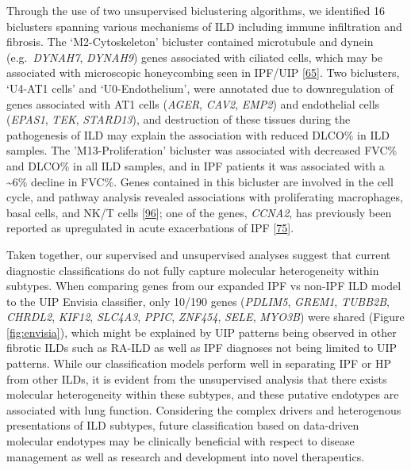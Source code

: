 \documentclass[
]{article}
\begin{document}
Through the use of two unsupervised biclustering algorithms, we identified 16 biclusters spanning various mechanisms of ILD including immune infiltration and fibrosis. The `M2-Cytoskeleton' bicluster contained microtubule and dynein (e.g.~\textit{DYNAH7}, \textit{DYNAH9}) genes associated with ciliated cells, which may be associated with microscopic honeycombing seen in IPF/UIP {[}\protect\hyperlink{ref-yang_expression_2013}{65}{]}. Two biclusters, `U4-AT1 cells' and `U0-Endothelium', were annotated due to downregulation of genes associated with AT1 cells (\textit{AGER}, \textit{CAV2}, \textit{EMP2}) and endothelial cells (\textit{EPAS1}, \textit{TEK}, \textit{STARD13}), and destruction of these tissues during the pathogenesis of ILD may explain the association with reduced DLCO\% in ILD samples. The 'M13-Proliferation' bicluster was associated with decreased FVC\% and DLCO\% in all ILD samples, and in IPF patients it was associated with a \textasciitilde6\% decline in FVC\%. Genes contained in this bicluster are involved in the cell cycle, and pathway analysis revealed associations with proliferating macrophages, basal cells, and NK/T cells {[}\protect\hyperlink{ref-travaglini_molecular_2020}{96}{]}; one of the genes, \textit{CCNA2}, has previously been reported as upregulated in acute exacerbations of IPF {[}\protect\hyperlink{ref-konishi_gene_2009}{75}{]}.

Taken together, our supervised and unsupervised analyses suggest that current diagnostic classifications do not fully capture molecular heterogeneity within subtypes. When comparing genes from our expanded IPF vs non-IPF ILD model to the UIP Envisia classifier, only 10/190 genes (\textit{PDLIM5}, \textit{GREM1}, \textit{TUBB2B}, \textit{CHRDL2}, \textit{KIF12}, \textit{SLC4A3}, \textit{PPIC}, \textit{ZNF454}, \textit{SELE}, \textit{MYO3B}) were shared (Figure \ref{fig:envisia}), which might be explained by UIP patterns being observed in other fibrotic ILDs such as RA-ILD as well as IPF diagnoses not being limited to UIP patterns. While our classification models perform well in separating IPF or HP from other ILDs, it is evident from the unsupervised analysis that there exists molecular heterogeneity within these subtypes, and these putative endotypes are associated with lung function. Considering the complex drivers and heterogenous presentations of ILD subtypes, future classification based on data-driven molecular endotypes may be clinically beneficial with respect to disease management as well as research and development into novel therapeutics.
\end{document}
